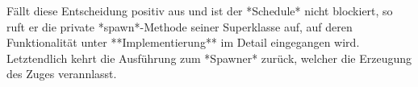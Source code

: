 Fällt diese Entscheidung positiv aus und ist der *Schedule* nicht blockiert, so ruft er die private *spawn*-Methode seiner Superklasse auf, auf deren Funktionalität unter **Implementierung** im Detail eingegangen wird. Letztendlich kehrt die Ausführung zum *Spawner* zurück, welcher die Erzeugung des Zuges verannlasst.